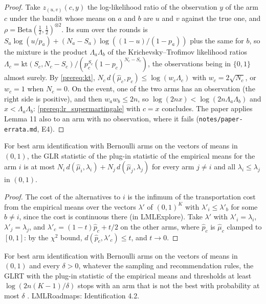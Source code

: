 \begin{proof}
  \leanok
  Take $z_{(u, v)}(c, y)$ the log-likelihood ratio of the observation $y$ of the arm $c$ under the
  bandit whose means on $a$ and $b$ are $u$ and $v$ against the true one, and
  $\rho = \mathrm{Beta}(\tfrac12, \tfrac12)^{\otimes 2}$. Its sum over the rounds is
  $S_a \log(u/p_a) + (N_a - S_a)\log((1-u)/(1-p_a))$ plus the same for $b$, so the mixture is the
  product $\Lambda_a \Lambda_b$ of the Krichevsky--Trofimov likelihood ratios
  $\Lambda_c = \mathrm{kt}(S_c, N_c - S_c) / (p_c^{S_c} (1-p_c)^{N_c - S_c})$, the observations
  being in $\{0, 1\}$ almost surely. By \cref{prereq:kt}, $N_c\, d(\hat\mu_c, p_c) \le
  \log(w_c \Lambda_c)$ with $w_c = 2\sqrt{N_c}$, or $w_c = 1$ when $N_c = 0$. On the event, one of
  the two arms has an observation (the right side is positive), and then $w_a w_b \le 2n$, so
  $\log(2nx) < \log(2n\Lambda_a\Lambda_b)$ and $x < \Lambda_a \Lambda_b$:
  \cref{prereq:lr_supermartingale} with $c = x$ concludes. The paper applies Lemma 11 also to an
  arm with no observation, where it fails (\texttt{notes/paper-errata.md}, E4).
\end{proof}

\begin{lemma}
  \label{prereq:kt_glr}
  \leanok
  For best arm identification with Bernoulli arms on the vectors of means in $(0, 1)$, the GLR
  statistic of the plug-in statistic of the empirical means for the arm $i$ is at most
  $N_i\, d(\hat\mu_i, \lambda_i) + N_j\, d(\hat\mu_j, \lambda_j)$ for every arm $j \ne i$ and all
  $\lambda_i \le \lambda_j$ in $(0, 1)$.
\end{lemma}

\begin{proof}
  \leanok
  The cost of the alternatives to $i$ is the infimum of the transportation cost from the empirical
  means over the vectors $\lambda'$ of $(0, 1)^K$ with $\lambda'_i \le \lambda'_b$ for some
  $b \ne i$, since the cost is continuous there (in LMLExplore). Take $\lambda'$ with
  $\lambda'_i = \lambda_i$, $\lambda'_j = \lambda_j$, and
  $\lambda'_c = (1 - t)\hat p_c + t/2$ on the other arms, where $\hat p_c$ is $\hat\mu_c$ clamped to
  $[0, 1]$: by the $\chi^2$ bound, $d(\hat p_c, \lambda'_c) \le t$, and $t \to 0$.
\end{proof}

\begin{lemma}
  \label{prereq:kt_threshold}
  \leanok
  For best arm identification with Bernoulli arms on the vectors of means in $(0, 1)$ and every
  $\delta > 0$, whatever the sampling and recommendation rules, the GLRT with the plug-in statistic
  of the empirical means and thresholds at least $\log(2n(K-1)/\delta)$ stops with an arm that is
  not the best with probability at most $\delta$ \cite[Theorem 10]{GK16}. LMLRoadmaps:
  Identification 4.2.
\end{lemma}

